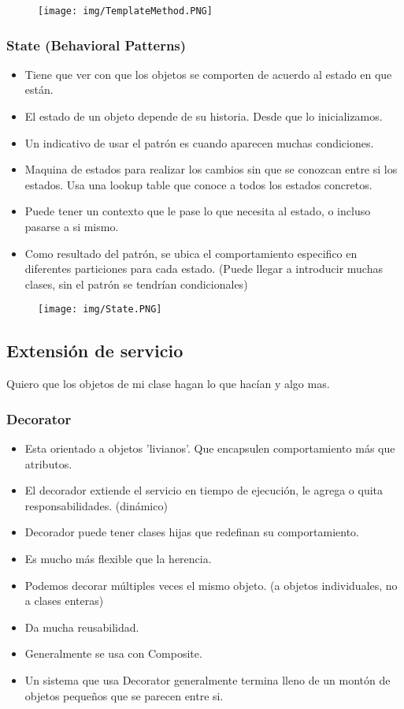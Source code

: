 \begin{figure}[!htb]
    \centering
    \texttt{[image: img/TemplateMethod.PNG]}
\end{figure}

\subsubsection*{State (Behavioral Patterns)}
\begin{itemize}
\item Tiene que ver con que los objetos se comporten de acuerdo al estado en que están.
\item El estado de un objeto depende de su historia. Desde que lo inicializamos.
\item Un indicativo de usar el patrón es cuando aparecen muchas condiciones.
\item Maquina de estados para realizar los cambios sin que se conozcan entre si los estados. Usa una lookup table que conoce a todos los estados concretos.
\item Puede tener un contexto que le pase lo que necesita al estado, o incluso pasarse a si mismo.
\item Como resultado del patrón, se ubica el comportamiento especifico en diferentes particiones para cada estado. (Puede llegar a introducir muchas clases, sin el patrón se tendrían condicionales)
\end{itemize}


\begin{figure}[!htb]
    \centering
    \texttt{[image: img/State.PNG]}
\end{figure}

\subsection*{Extensión de servicio}
Quiero que los objetos de mi clase hagan lo que hacían y algo mas.

\subsubsection*{Decorator}
\begin{itemize}
\item Esta orientado a objetos 'livianos'. Que encapsulen comportamiento más que atributos.
\item El decorador extiende el servicio en tiempo de ejecución, le agrega o quita responsabilidades. (dinámico)
\item Decorador puede tener clases hijas que redefinan su comportamiento.
\item Es mucho más flexible que la herencia.
\item Podemos decorar múltiples veces el mismo objeto. (a objetos individuales, no a clases enteras)
\item Da mucha reusabilidad.
\item Generalmente se usa con Composite.
\item Un sistema que usa Decorator generalmente termina lleno de un montón de objetos pequeños que se parecen entre si.
\end{itemize}


